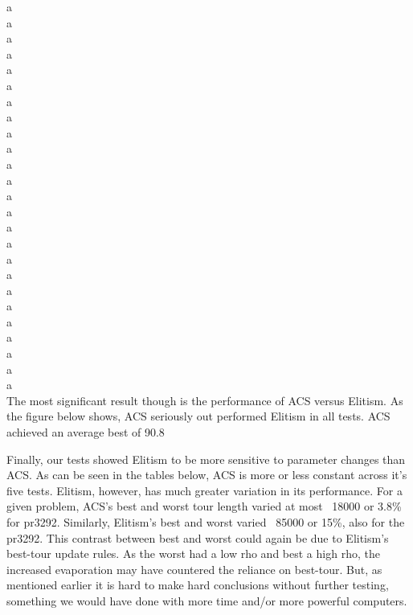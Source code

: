 \documentclass[11pt,twocolumn]{article}
\begin{document}
a\\a\\a\\a\\a\\a\\a\\a\\a\\a\\a\\a\\a\\a\\a\\a\\a\\a\\a\\a\\a\\a\\a\\a\\a\\

The most significant result though is the performance of ACS versus Elitism. As the figure below shows, ACS seriously out performed Elitism in all tests. ACS achieved an average best of 90.8%

\hspace{100cm}

Finally, our tests showed Elitism to be more sensitive to parameter changes than ACS. As can be seen in the tables below, ACS is more or less constant across it’s five tests. Elitism, however, has much greater variation in its performance. For a given problem, ACS’s best and worst tour length varied at most ~18000 or 3.8\% for pr3292. Similarly, Elitism’s best and worst varied ~85000 or 15\%, also for the pr3292. This contrast between best and worst could again be due to Elitism’s best-tour update rules. As the worst had a low rho and best a high rho, the increased evaporation may have countered the reliance on best-tour. But, as mentioned earlier it is hard to make hard conclusions without further testing, something we would have done with more time and/or more powerful computers.
\end{document}
